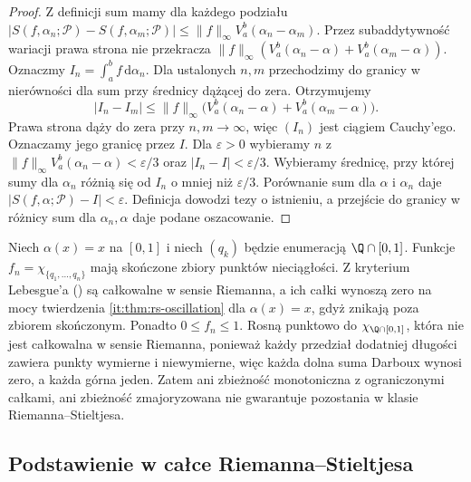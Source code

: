 \begin{proof}
Z definicji sum mamy dla każdego podziału
$|S(f,\alpha_n;\mathcal P)-S(f,\alpha_m;\mathcal P)|\le
\|f\|_\infty V_a^b(\alpha_n-\alpha_m)$.
Przez subaddytywność wariacji prawa strona nie przekracza
$\|f\|_\infty(V_a^b(\alpha_n-\alpha)+V_a^b(\alpha_m-\alpha))$.
Oznaczmy $I_n=\int_a^b f\,\mathrm d\alpha_n$.
Dla ustalonych $n,m$ przechodzimy do granicy
w nierówności dla sum przy średnicy dążącej do zera.
Otrzymujemy
\[
 |I_n-I_m|\le\|f\|_\infty
 \bigl(V_a^b(\alpha_n-\alpha)+V_a^b(\alpha_m-\alpha)\bigr).
\]
Prawa strona dąży do zera przy $n,m\to\infty$,
więc $(I_n)$ jest ciągiem Cauchy'ego. Oznaczamy jego granicę przez $I$. Dla $\varepsilon>0$ wybieramy $n$ z $\|f\|_\infty V_a^b(\alpha_n-\alpha)<\varepsilon/3$ oraz $|I_n-I|<\varepsilon/3$. Wybieramy średnicę, przy której sumy dla $\alpha_n$ różnią się od $I_n$ o mniej niż $\varepsilon/3$. Porównanie sum dla $\alpha$ i $\alpha_n$ daje $|S(f,\alpha;\mathcal P)-I|<\varepsilon$. Definicja dowodzi tezy o istnieniu, a przejście do granicy w różnicy sum dla $\alpha_n,\alpha$ daje podane oszacowanie.
\end{proof}
\begin{przyklad}\label{ma1:kh:ex:rs-dominated-failure}
Niech $\alpha(x)=x$ na $[0,1]$ i niech $(q_k)$ będzie enumeracją $\Q\cap[0,1]$. Funkcje $f_n=\chi_{\{q_1,\ldots,q_n\}}$ mają skończone
zbiory punktów nieciągłości. Z kryterium Lebesgue'a
()
są całkowalne w sensie Riemanna, a ich całki wynoszą
zero na mocy twierdzenia \ref{it:thm:rs-oscillation}
dla $\alpha(x)=x$, gdyż znikają poza zbiorem skończonym.
Ponadto $0\le f_n\le1$. Rosną punktowo do $\chi_{\Q\cap[0,1]}$, która nie jest całkowalna w sensie Riemanna, ponieważ każdy przedział dodatniej długości zawiera punkty wymierne i niewymierne, więc każda dolna suma Darboux wynosi zero, a każda górna jeden. Zatem ani zbieżność monotoniczna z ograniczonymi całkami, ani zbieżność zmajoryzowana nie gwarantuje pozostania w klasie Riemanna--Stieltjesa.
\end{przyklad}
\subsection{Podstawienie w całce Riemanna--Stieltjesa}


